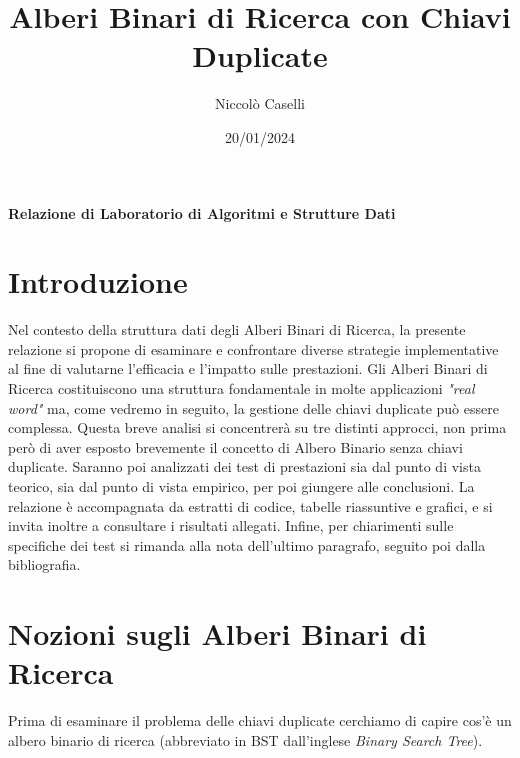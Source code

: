 \documentclass{article}
\title{Alberi Binari di Ricerca con Chiavi Duplicate}
\author{Niccolò Caselli}
\date{20/01/2024}
\begin{document}
\begin{titlepage}
  \maketitle
  \vspace*{\fill}
  \begin{center}
    \textbf{Relazione di Laboratorio di Algoritmi e Strutture Dati}
  \end{center}
  \vspace*{\fill}
\end{titlepage}


\renewcommand{\contentsname}{Indice} %
\tableofcontents
\newpage

\section{Introduzione}
Nel contesto della struttura dati degli Alberi Binari di Ricerca, la presente relazione si propone di esaminare e confrontare diverse strategie implementative al fine di valutarne l'efficacia e l'impatto sulle prestazioni.
Gli Alberi Binari di Ricerca costituiscono una struttura fondamentale in molte applicazioni \textit{"real word"} ma, come vedremo in seguito, la gestione delle chiavi duplicate può essere complessa. Questa breve analisi si concentrerà su tre distinti approcci, non prima però di aver esposto brevemente il concetto di Albero Binario senza chiavi duplicate.
Saranno poi analizzati dei test di prestazioni sia dal punto di vista teorico, sia dal punto di vista empirico, per poi giungere alle conclusioni. 
La relazione è accompagnata da estratti di codice, tabelle riassuntive e grafici, e si invita inoltre a consultare i risultati allegati.
Infine, per chiarimenti sulle specifiche dei test si rimanda alla nota dell'ultimo paragrafo, seguito poi dalla bibliografia.

\section{Nozioni sugli Alberi Binari di Ricerca}

Prima di esaminare il problema delle chiavi duplicate cerchiamo di capire cos'è un albero binario di ricerca (abbreviato in BST dall'inglese \textit{Binary Search Tree}).
\end{document}
